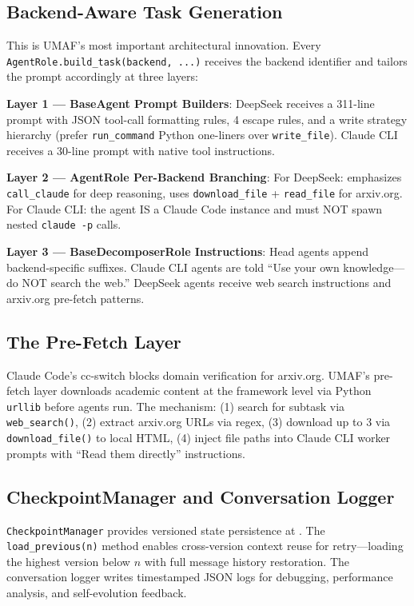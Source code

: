\subsection{Backend-Aware Task Generation}

\raggedright
This is UMAF's most important architectural innovation. Every \texttt{AgentRole.build\_task(backend, ...)} receives the backend identifier and tailors the prompt accordingly at three layers:

\textbf{Layer 1 --- BaseAgent Prompt Builders}: DeepSeek receives a 311-line prompt with JSON tool-call formatting rules, 4 escape rules, and a write strategy hierarchy (prefer \texttt{run\_command} Python one-liners over \texttt{write\_file}). Claude CLI receives a 30-line prompt with native tool instructions.

\textbf{Layer 2 --- AgentRole Per-Backend Branching}: For DeepSeek: emphasizes \texttt{call\_claude} for deep reasoning, uses \texttt{download\_file} + \texttt{read\_file} for arxiv.org. For Claude CLI: the agent IS a Claude Code instance and must NOT spawn nested \texttt{claude -p} calls.

\textbf{Layer 3 --- BaseDecomposerRole Instructions}: Head agents append backend-specific suffixes. Claude CLI agents are told ``Use your own knowledge---do NOT search the web.'' DeepSeek agents receive web search instructions and arxiv.org pre-fetch patterns.

\subsection{The Pre-Fetch Layer}

Claude Code's cc-switch blocks domain verification for arxiv.org. UMAF's pre-fetch layer downloads academic content at the framework level via Python \texttt{urllib} before agents run. The mechanism: (1) search for subtask via \texttt{web\_search()}, (2) extract arxiv.org URLs via regex, (3) download up to 3 via \texttt{download\_file()} to local HTML, (4) inject file paths into Claude CLI worker prompts with ``Read them directly'' instructions.

\subsection{CheckpointManager and Conversation Logger}

\texttt{CheckpointManager} provides versioned state persistence at . The \texttt{load\_previous(n)} method enables cross-version context reuse for retry---loading the highest version below $n$ with full message history restoration. The conversation logger writes timestamped JSON logs for debugging, performance analysis, and self-evolution feedback.

